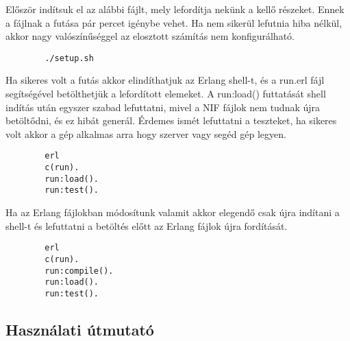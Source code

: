 	Először indítsuk el az alábbi fájlt, mely lefordítja nekünk a kellő részeket. Ennek a fájlnak a futása pár percet igénybe vehet. Ha nem sikerül lefutnia hiba nélkül, akkor nagy valószínűséggel az elosztott számítás nem konfigurálható. 
	\begin{verbatim}
		./setup.sh
	\end{verbatim}
	Ha sikeres volt a futás akkor elindíthatjuk az Erlang shell-t, és a run.erl fájl segítségével betölthetjük a lefordított elemeket. A run:load() futtatását shell indítás után egyszer szabad lefuttatni, mivel a NIF fájlok nem tudnak újra betöltődni, és ez hibát generál.\newline
	Érdemes ismét lefuttatni a teszteket, ha sikeres volt akkor a gép alkalmas arra hogy szerver vagy segéd gép legyen.
	\begin{verbatim}
		erl
		c(run).
		run:load().
		run:test().
	\end{verbatim}
	Ha az Erlang fájlokban módosítunk valamit akkor elegendő csak újra indítani a shell-t és lefuttatni a betöltés előtt az Erlang fájlok újra fordítását.
	\begin{verbatim}
		erl
		c(run).
		run:compile().
		run:load().
		run:test().
	\end{verbatim}  
	

\subsection{Használati útmutató}
